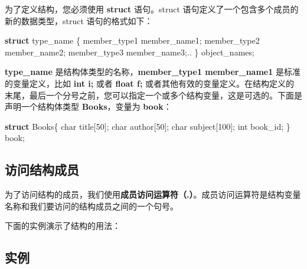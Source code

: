 \documentclass[
]{article}
\newenvironment{Shaded}{}{}
\newcommand{\DataTypeTok}[1]{\textcolor[rgb]{0.56,0.13,0.00}{#1}}
\newcommand{\DecValTok}[1]{\textcolor[rgb]{0.25,0.63,0.44}{#1}}
\newcommand{\KeywordTok}[1]{\textcolor[rgb]{0.00,0.44,0.13}{\textbf{#1}}}
\newcommand{\NormalTok}[1]{#1}
\newcommand{\OperatorTok}[1]{\textcolor[rgb]{0.40,0.40,0.40}{#1}}
\begin{document}
为了定义结构，您必须使用 \textbf{struct} 语句。struct
语句定义了一个包含多个成员的新的数据类型，struct 语句的格式如下：

\begin{Shaded}
\begin{Highlighting}[]
\KeywordTok{struct}\NormalTok{ type\_name }\OperatorTok{\{}
\NormalTok{   member\_type1 member\_name1}\OperatorTok{;}
\NormalTok{   member\_type2 member\_name2}\OperatorTok{;}
\NormalTok{   member\_type3 member\_name3}\OperatorTok{;..}
\OperatorTok{\}}\NormalTok{ object\_names}\OperatorTok{;}
\end{Highlighting}
\end{Shaded}

\textbf{type\_name} 是结构体类型的名称，\textbf{member\_type1
member\_name1} 是标准的变量定义，比如 \textbf{int i;} 或者 \textbf{float
f;}
或者其他有效的变量定义。在结构定义的末尾，最后一个分号之前，您可以指定一个或多个结构变量，这是可选的。下面是声明一个结构体类型
\textbf{Books}，变量为 \textbf{book}：

\begin{Shaded}
\begin{Highlighting}[]
\KeywordTok{struct}\NormalTok{ Books}\OperatorTok{\{}   
   \DataTypeTok{char}\NormalTok{  title}\OperatorTok{[}\DecValTok{50}\OperatorTok{];}   
   \DataTypeTok{char}\NormalTok{  author}\OperatorTok{[}\DecValTok{50}\OperatorTok{];}   
   \DataTypeTok{char}\NormalTok{  subject}\OperatorTok{[}\DecValTok{100}\OperatorTok{];}      
   \DataTypeTok{int}\NormalTok{   book\_id}\OperatorTok{;}
\OperatorTok{\}}\NormalTok{ book}\OperatorTok{;}
\end{Highlighting}
\end{Shaded}

\hypertarget{ux8bbfux95eeux7ed3ux6784ux6210ux5458}{%
\subsection{访问结构成员}\label{ux8bbfux95eeux7ed3ux6784ux6210ux5458}}

为了访问结构的成员，我们使用\textbf{成员访问运算符（.）}。成员访问运算符是结构变量名称和我们要访问的结构成员之间的一个句号。

下面的实例演示了结构的用法：

\hypertarget{ux5b9eux4f8b-15}{%
\subsection{实例}\label{ux5b9eux4f8b-15}}
\end{document}
